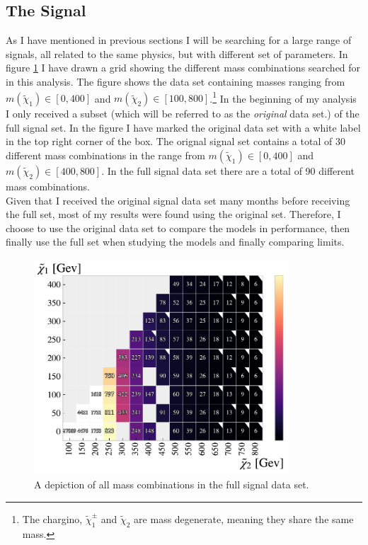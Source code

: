 \subsection{The Signal}\label{subsec:signal}
As I have mentioned in previous sections I will be searching for a large range of signals, all related to the same
physics, but with different set of parameters. In figure \ref{fig:nrSignal} I have drawn a grid showing the different mass combinations 
searched for in this analysis. The figure shows the data set containing masses ranging from $m({\tilde{\chi}_1})\in[0,400]$
and $m({\tilde{\chi}_2})\in[100,800]$.\footnote{The chargino, $\tilde{\chi}^{\pm}_1$ and $\tilde{\chi}_2$ are mass degenerate, meaning they 
share the same mass.} In the beginning of my analysis I only received a subset (which will be referred to as the 
\emph{original} data set.) of the full signal set. In the figure I have marked the original data set with a white label in the top 
right corner of the box. The orignal signal set contains a total of 30 different mass combinations in the range from 
$m({\tilde{\chi}_1})\in[0,400]$ and $m({\tilde{\chi}_2})\in[400,800]$. In the full signal data set there are a total of 90 different mass combinations.
\\
Given that I received the original signal data set many months before receiving the full set, most of my results were found using the 
original set. Therefore, I choose to use the original data set to compare the models in performance, then finally use the full set 
when studying the models and finally comparing limits.
\begin{figure}
  \centering
  \includegraphics[width=0.85\textwidth]{Figures/MLResults/NN/SUSY/Grid/NrSignalEvents.pdf}
  \caption{A depiction of all mass combinations in the full signal data set.}
  \label{fig:nrSignal}
\end{figure}

